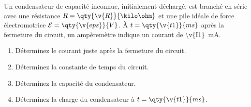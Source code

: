 Un condensateur de capacité inconnue, initialement déchargé, est branché en série avec une résistance $R = \qty{\v{R}}{\kilo\ohm}$ et une pile idéale de force électromotrice $\mathcal{E} = \qty{\v{eps}}{V}$. À $t = \qty{\v{t1}}{ms}$ après la fermeture du circuit, un ampèremètre indique un courant de \qty{\v{I1}}{mA}.

\begin{enumerate}[label=\alph*)]
    \item Déterminez le courant juste après la fermeture du circuit.
    \item Déterminez la constante de temps du circuit.
    \item Déterminez la capacité du condensateur.
    \item Déterminez la charge du condensateur à $t = \qty{\v{t1}}{ms}$.
\end{enumerate}
